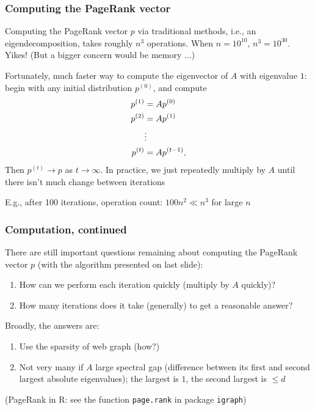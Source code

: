 \documentclass[mathserif]{beamer}
\def\red{\color[rgb]{0.8,0,0}}
\begin{document}
\begin{frame}
\frametitle{Computing the PageRank vector}
\smallskip
Computing the PageRank vector $p$ via
traditional methods, i.e., an eigendecomposition, 
takes roughly $n^3$ operations.
When $n=10^{10}$, $n^3=10^{30}$.
Yikes! (But a bigger concern would be memory ...)

\bigskip
Fortunately, {\red much faster} way
to compute the eigenvector of $A$ with eigenvalue $1$:
begin with {\red any initial distribution $p^{(0)}$},
and compute
\begin{align*}
p^{(1)} &= A p^{(0)} \\
p^{(2)} &= A p^{(1)} \\
&\vdots  \\
p^{(t)} &= A p^{(t-1)}, 
\vspace{-10pt}\end{align*}
Then $p^{(t)} \rightarrow p$ as $t \rightarrow \infty$. 
In practice, we just repeatedly multiply by $A$ until
there isn't much change between iterations

\bigskip
E.g., after 100 iterations, operation count: $100n^2 
\ll n^3$ for large $n$
\end{frame}

\begin{frame}
\frametitle{Computation, continued}

There are still important questions remaining about 
computing the PageRank vector $p$ (with the algorithm
presented on last slide):
\begin{enumerate}
\item How can we perform each iteration quickly 
(multiply by $A$ quickly)?
\item How many iterations does it take (generally)
to get a reasonable answer?
\end{enumerate}

\bigskip
Broadly, the answers are:
\begin{enumerate}
\item Use the {\red sparsity of web graph} (how?)
\item Not very many if $A$ large {\red spectral gap}
(difference between its first and second largest
absolute eigenvalues); the largest is $1$, the second 
largest is $\leq d$
\end{enumerate}

\bigskip
(PageRank in R: see the function {\tt page.rank} in 
package {\tt igraph})
\end{frame}
\end{document}
